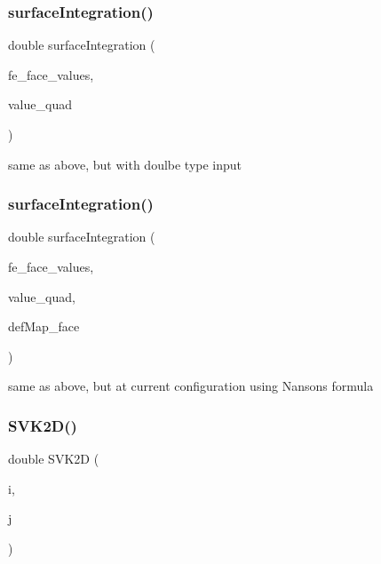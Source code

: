 \subsubsection{\texorpdfstring{surfaceIntegration()}{surfaceIntegration()}\hspace{0.1cm}{\footnotesize\ttfamily [5/6]}}
{\footnotesize\ttfamily double surface\+Integration (\begin{DoxyParamCaption}\item[{const F\+E\+Face\+Values$<$ dim $>$ \&}]{fe\+\_\+face\+\_\+values,  }\item[{dealii\+::\+Table$<$ 1, double $>$ \&}]{value\+\_\+quad }\end{DoxyParamCaption})}

same as above, but with doulbe type input \mbox{\label{class_residual_a8c32782b660888461d7b8f8a728b2751}} 
\subsubsection{\texorpdfstring{surfaceIntegration()}{surfaceIntegration()}\hspace{0.1cm}{\footnotesize\ttfamily [6/6]}}
{\footnotesize\ttfamily double surface\+Integration (\begin{DoxyParamCaption}\item[{const F\+E\+Face\+Values$<$ dim $>$ \&}]{fe\+\_\+face\+\_\+values,  }\item[{dealii\+::\+Table$<$ 1, double $>$ \&}]{value\+\_\+quad,  }\item[{\mbox{\hyperlink{structdeformation_map}{deformation\+Map}}$<$ T, dim $>$ \&}]{def\+Map\+\_\+face }\end{DoxyParamCaption})}

same as above, but at current configuration using Nanson\textquotesingle{}s formula \mbox{\label{class_residual_abd1627afa72ac735e6907067e1d47bb6}} 
\subsubsection{\texorpdfstring{SVK2D()}{SVK2D()}}
{\footnotesize\ttfamily double S\+V\+K2D (\begin{DoxyParamCaption}\item[{unsigned int}]{i,  }\item[{unsigned int}]{j }\end{DoxyParamCaption})}

